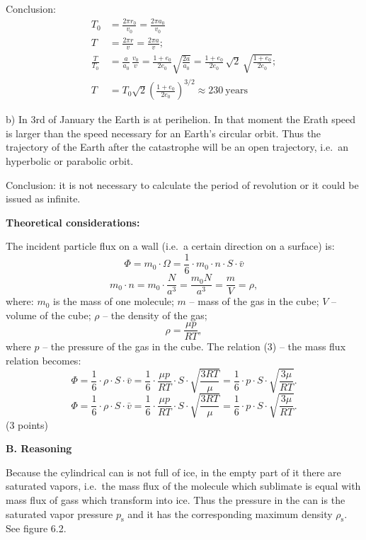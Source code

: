 \begin{description}
  Conclusion:
  \begin{align*}
    T_0 &= \frac{2\pi r_0}{v_0} = \frac{2\pi a_0}{v_0} \\
    T &= \frac{2\pi r}{v} = \frac{2\pi a}{v}; \\
    \frac{T}{T_0} &= \frac{a}{a_0}\,\frac{v_0}{v}
      = \frac{1 + e_0}{2e_0}\sqrt{\frac{2a}{a_0}}
      = \frac{1 + e_0}{2e_0}\,\sqrt{2}\,\sqrt{\frac{1 + e_0}{2e_0}}; \\
    T &= T_0\sqrt{2}\left(\frac{1 + e_0}{2e_0}\right)^{3/2}
      \approx 230\ \text{years}
  \end{align*}

  b) In 3rd of January the Earth is at perihelion. In that moment the Erath %
  speed is larger than the speed necessary for an Earth's circular orbit.
  Thus the trajectory of the Earth after the catastrophe will be an open
  trajectory, i.e.\ an hyperbolic or parabolic orbit.

  Conclusion: it is not necessary to calculate the period of revolution or it
  could be issued as infinite.
\end{description}

\textbf{Theoretical considerations:}

The incident particle flux on a wall (i.e.\ a certain direction on a surface)
is:
\[ \Phi = m_0 \cdot \Omega
   = \frac{1}{6}\cdot m_0 \cdot n \cdot S \cdot \bar{v} \tag*{(3)} \]
\[ m_0 \cdot n = m_0 \cdot \frac{N}{a^3} = \frac{m_0 N}{a^3}
   = \frac{m}{V} = \rho, \]
where: $m_0$ is the mass of one molecule; $m$ -- mass of the gas in the cube;
$V$ -- volume of the cube; $\rho$ -- the density of the gas;
\[ \rho = \frac{\mu p}{RT}, \]
where $p$ -- the pressure of the gas in the cube. The relation (3) -- the mass
flux relation becomes:
\[ \Phi = \frac{1}{6}\cdot\rho\cdot S\cdot\bar{v}
   = \frac{1}{6}\cdot\frac{\mu p}{RT}\cdot S\cdot\sqrt{\frac{3RT}{\mu}}
   = \frac{1}{6}\cdot p\cdot S\cdot\sqrt{\frac{3\mu}{RT}}. \tag*{(4)} \]
\[ \Phi = \frac{1}{6}\cdot\rho\cdot S\cdot\bar{v}
   = \frac{1}{6}\cdot\frac{\mu p}{RT}\cdot S\cdot\sqrt{\frac{3RT}{\mu}}
   = \frac{1}{6}\cdot p\cdot S\cdot\sqrt{\frac{3\mu}{RT}}. \tag*{(5)} \]
\hfill(3 points)

\textbf{B. Reasoning}

Because the cylindrical can is not full of ice, in the empty part of it there
are saturated vapors, i.e.\ the mass flux of the molecule which sublimate is
equal with mass flux of gass %
which transform into ice. Thus the pressure in the can is the saturated vapor
pressure $p_{\mathrm{s}}$ and it has the corresponding maximum density
$\rho_{\mathrm{s}}$. See figure 6.2.

